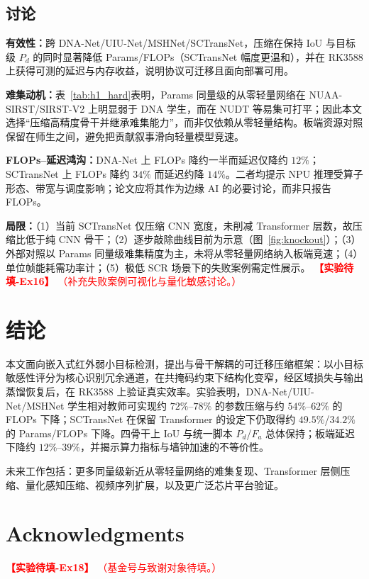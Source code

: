 \documentclass[lettersize,journal]{IEEEtran}
\newcommand{\ExpTodo}[2]{%
  \textcolor{red}{\textbf{【实验待填-#1】}}%
  \textcolor{red}{（#2）}%
}
\begin{document}
\subsection{讨论}
\label{sec:discuss}
\textbf{有效性：}跨 DNA-Net/UIU-Net/MSHNet/SCTransNet，压缩在保持 IoU 与目标级 $P_d$ 的同时显著降低 Params/FLOPs（SCTransNet 幅度更温和），并在 RK3588 上获得可测的延迟与内存收益，说明协议可迁移且面向部署可用。

\textbf{难集动机：}表~\ref{tab:h1_hard}表明，Params 同量级的从零轻量网络在 NUAA-SIRST/SIRST-V2 上明显弱于 DNA 学生，而在 NUDT 等易集可打平；因此本文选择“压缩高精度骨干并继承难集能力”，而非仅依赖从零轻量结构。板端资源对照保留在师生之间，避免把贡献叙事滑向轻量模型竞速。

\textbf{FLOPs--延迟鸿沟：}DNA-Net 上 FLOPs 降约一半而延迟仅降约 $12\%$；SCTransNet 上 FLOPs 降约 $34\%$ 而延迟约降 $14\%$。二者均提示 NPU 推理受算子形态、带宽与调度影响；论文应将其作为边缘 AI 的必要讨论，而非只报告 FLOPs。

\textbf{局限：}（1）当前 SCTransNet 仅压缩 CNN 宽度，未削减 Transformer 层数，故压缩比低于纯 CNN 骨干；（2）逐步敲除曲线目前为示意（图~\ref{fig:knockout}）；（3）外部对照以 Params 同量级难集精度为主，未将从零轻量网络纳入板端竞速；（4）单位帧能耗需功率计；（5）极低 SCR 场景下的失败案例需定性展示。
\ExpTodo{Ex16}{补充失败案例可视化与量化敏感讨论。}

\section{结论}
\label{sec:concl}
本文面向嵌入式红外弱小目标检测，提出与骨干解耦的可迁移压缩框架：以小目标敏感性评分为核心识别冗余通道，在共掩码约束下结构化变窄，经区域损失与输出蒸馏恢复后，在 RK3588 上验证真实效率。实验表明，DNA-Net/UIU-Net/MSHNet 学生相对教师可实现约 $72\%$--$78\%$ 的参数压缩与约 $54\%$--$62\%$ 的 FLOPs 下降；SCTransNet 在保留 Transformer 的设定下仍取得约 $49.5\%$/$34.2\%$ 的 Params/FLOPs 下降。四骨干上 IoU 与统一脚本 $P_d$/$F_a$ 总体保持；板端延迟下降约 $12\%$--$39\%$，并揭示算力指标与墙钟加速的不等价性。

未来工作包括：更多同量级新近从零轻量网络的难集复现、Transformer 层侧压缩、量化感知压缩、视频序列扩展，以及更广泛芯片平台验证。

\section*{Acknowledgments}
\ExpTodo{Ex18}{基金号与致谢对象待填。}
\end{document}
